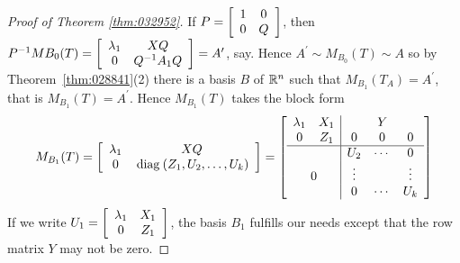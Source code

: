 \begin{proof}[Proof of Theorem \ref{thm:032952}]
If $P = \left[ \begin{array}{cc}
1 & 0 \\
0 & Q
\end{array} \right]$, then $P^{-1}MB_0(T) = \left[ \begin{array}{cc}
\lambda_1 & XQ \\
0 & Q^{-1}A_1Q
\end{array} \right] = A^\prime$, say. Hence $A^\prime \sim M_{B_0}(T) \sim A$ so by Theorem~\ref{thm:028841}(2) there is a basis $B$ of $\mathbb{R}^n$ such that $M_{B_1}(T_A) = A^\prime$, that is $M_{B_1}(T) = A^\prime$. Hence $M_{B_1}(T)$ takes the block form
\begin{equation}\label{eq:thm1proof11_1}
M_{B_1}(T) = \leftB \begin{array}{cc}
\lambda_1 & XQ \\
0 & \diag(Z_1, U_2, \dots, U_k)
\end{array} \rightB = \leftB \begin{array}{cc|ccc}
\lambda_1 & X_1 & \multicolumn{3}{c}{Y}\\
0 & Z_1 & 0 & 0 & 0 \\
\hline
& & U_2 & \cdots & 0 \\
\multicolumn{2}{c|}{0} & \vdots & & \vdots \\
& & 0 & \cdots & U_k
\end{array} \rightB
\end{equation}
If we write $U_1 = \left[ \begin{array}{cc}
\lambda_1 & X_1 \\
0 & Z_1
\end{array} \right]$, the basis $B_{1}$ fulfills our needs except that the row matrix $Y$ may not be zero.



\end{proof}
